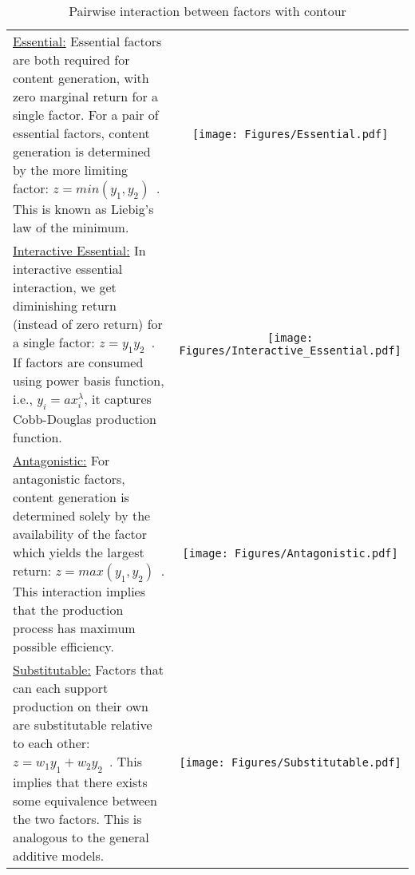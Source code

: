\begin{table}[htb]
  \caption{Pairwise interaction between factors with contour}
  \label{tab:interaction}
  \centering
  \begin{tabular}{m{}c}
	\vspace{-5pt}
    \uline{Essential:} Essential factors are both required for content generation, with zero marginal return for a single factor. For a pair of essential factors, content generation is determined by the more limiting factor: $z = min(y_1, y_2)$~\cite{tilman1980}. This is known as Liebig's law of the minimum.
    &
    \begin{minipage}{.17\textwidth}
      \texttt{[image: Figures/Essential.pdf]}
    \end{minipage}
    \\ 
    \vspace{-5pt}
    \uline{Interactive Essential:} In interactive essential interaction, we get diminishing return (instead of zero return) for a single factor: $z = y_1y_2$~\cite{tilman1980}. If factors are consumed using power basis function, i.e., $y_i = ax^\lambda_i$, it captures Cobb-Douglas production function.
    &
    \begin{minipage}{.17\textwidth}
      \texttt{[image: Figures/Interactive\_Essential.pdf]}
    \end{minipage}
    \\
    \vspace{-5pt}
    \uline{Antagonistic:} For antagonistic factors, content generation is determined solely by the availability of the factor which yields the largest return: $z = max(y_1, y_2)$~\cite{tilman1980}. This interaction implies that the production process has maximum possible efficiency. 
    &
    \begin{minipage}{.17\textwidth}
      \texttt{[image: Figures/Antagonistic.pdf]}
    \end{minipage}
    \\
    \vspace{-5pt}
    \uline{Substitutable:} Factors that can each support production on their own are substitutable relative to each other: $z = w_1y_1 + w_2y_2$~\cite{tilman1980}. This implies that there exists some equivalence between the two factors. This is analogous to the general additive models.
    &
    \begin{minipage}{.17\textwidth}
      \texttt{[image: Figures/Substitutable.pdf]}
    \end{minipage}
    \\
  \end{tabular}
\end{table}

